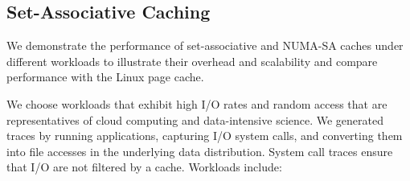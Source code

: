 \subsection{Set-Associative Caching}

We demonstrate the performance of set-associative and NUMA-SA caches under different
workloads to illustrate their overhead and scalability and compare
performance with the Linux page cache.

We choose workloads that exhibit high I/O rates and random access
that are representatives of cloud computing and data-intensive science.
We generated traces by running applications, capturing I/O system calls, and converting 
them into file accesses in the underlying data distribution.  System call traces 
ensure that I/O are not filtered by a cache.  Workloads include:

\vspace{-10pt}

